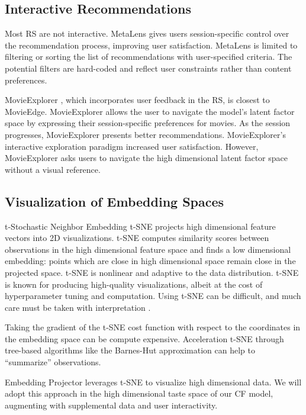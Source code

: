 \documentclass[sigchi, 12pt, nonacm=true, timestamp=true, screen=true]{acmart}
\begin{document}
\subsection{Interactive Recommendations}

Most RS are not interactive. MetaLens \cite{schafer2002meta} gives users session-specific control over the recommendation process, improving user satisfaction. MetaLens is limited to filtering or sorting the list of recommendations with user-specified criteria. The potential filters are hard-coded and reflect user constraints rather than content preferences. 

MovieExplorer \cite{taijala2018movieexplorer}, which incorporates user feedback in the RS, is closest to MovieEdge. MovieExplorer allows the user to navigate the model's latent factor space by expressing their session-specific preferences for movies.  As the session progresses, MovieExplorer presents better recommendations. MovieExplorer’s interactive exploration paradigm increased user satisfaction. However, MovieExplorer asks users to navigate the high dimensional latent factor space without a visual reference. 

\subsection{Visualization of Embedding Spaces}

t-Stochastic Neighbor Embedding \mbox{t-SNE} \cite{maaten2008visualizing} projects high dimensional feature vectors into 2D visualizations. \mbox{t-SNE} computes similarity scores between observations in the high dimensional feature space and finds a low dimensional embedding: points which are close in high dimensional space remain close in the projected space. \mbox{t-SNE} is nonlinear and adaptive to the data distribution. \mbox{t-SNE} is known for producing high-quality visualizations, albeit at the cost of hyperparameter tuning and computation. Using \mbox{t-SNE} can be difficult, and much care must be taken with interpretation \cite{wattenberg2016how}.

Taking the gradient of the \mbox{t-SNE} cost function with respect to the coordinates in the embedding space can be compute expensive.  Acceleration \mbox{t-SNE} through tree-based algorithms like the Barnes-Hut approximation \cite{van2014accelerating} can help to “summarize” observations.  

Embedding Projector \cite{smilkov2016embedding} leverages \mbox{t-SNE} to visualize high dimensional data. We will adopt this approach in the high dimensional taste space of our CF model, augmenting with supplemental data and user interactivity. 
\end{document}
